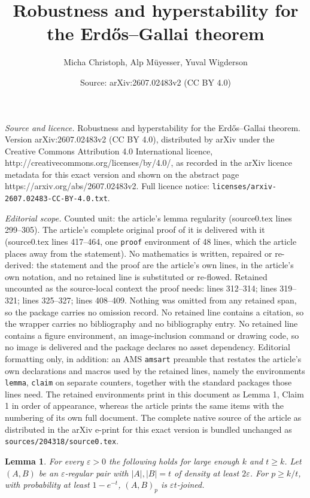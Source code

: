 \documentclass[10pt,a4paper]{amsart}
\title{Robustness and hyperstability for the Erd\H{o}s--Gallai theorem}
\author{Micha Christoph, Alp M\"uyesser, Yuval Wigderson}
\date{Source: arXiv:2607.02483v2 (CC BY 4.0)}
\newtheorem{lemma}{Lemma}
\newcommand\eps{\varepsilon}
\begin{document}
\maketitle

\noindent\emph{Source and licence.} Robustness and hyperstability for the Erd\H{o}s--Gallai theorem. Version arXiv:2607.02483v2 (CC BY 4.0), distributed by arXiv under the Creative Commons Attribution 4.0 International licence, http://creativecommons.org/licenses/by/4.0/, as recorded in the arXiv licence metadata for this exact version and shown on the abstract page https://arxiv.org/abs/2607.02483v2. Full licence notice: \texttt{licenses/arxiv-2607.02483-CC-BY-4.0.txt}.\par\smallskip

\noindent\textit{Editorial scope.} Counted unit: the article's lemma regularity (source0.tex lines 299--305). The article's complete original proof of it is delivered with it (source0.tex lines 417--464, one \texttt{proof} environment of 48 lines, which the article places away from the statement). No mathematics is written, repaired or re-derived: the statement and the proof are the article's own lines, in the article's own notation, and no retained line is substituted or re-flowed.  Retained uncounted as the source-local context the proof needs: lines 312--314; lines 319--321; lines 325--327; lines 408--409.  Nothing was omitted from any retained span, so the package carries no omission record.  No retained line contains a citation, so the wrapper carries no bibliography and no bibliography entry.  No retained line contains a figure environment, an image-inclusion command or drawing code, so no image is delivered and the package declares no asset dependency.  Editorial formatting only, in addition: an AMS \texttt{amsart} preamble that restates the article's own declarations and macros used by the retained lines, namely the environments \texttt{lemma}, \texttt{claim} on separate counters, together with the standard packages those lines need.  The retained environments print in this document as Lemma 1, Claim 1 in order of appearance, whereas the article prints the same items with the numbering of its own full document.  The complete native source of the article as distributed in the arXiv e-print for this exact version is bundled unchanged as \texttt{sources/204318/source0.tex}.
\begin{lemma}\label{lem: random joined}
    For every $\varepsilon>0$ the following holds for large enough $k$ and $t\geq k$. Let $(A,B)$ be an $\eps$-regular pair with $|A|,|B|=t$ of density at least $2\varepsilon$. For $p\geq k/t$, with probability at least $1-e^{-t}$, $(A,B)_p$ is $\varepsilon t$-joined.
\end{lemma}
\end{document}
